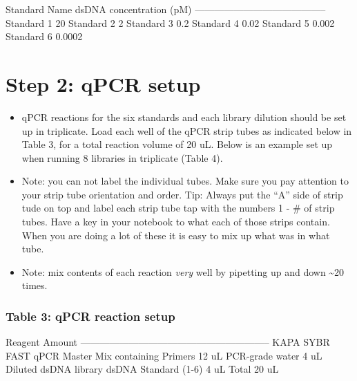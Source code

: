 \documentclass[
  letterpaper,
  DIV=11,
  numbers=noendperiod]{scrreprt}
\begin{document}
\textbar{} Standard Name \textbar{} dsDNA concentration (pM) \textbar{}
\textbar---------------\textbar--------------------------\textbar{}
\textbar{} Standard 1 \textbar{} 20 \textbar{} \textbar{} Standard 2
\textbar{} 2 \textbar{} \textbar{} Standard 3 \textbar{} 0.2 \textbar{}
\textbar{} Standard 4 \textbar{} 0.02 \textbar{} \textbar{} Standard 5
\textbar{} 0.002 \textbar{} \textbar{} Standard 6 \textbar{} 0.0002
\textbar{}

\hypertarget{step-2-qpcr-setup}{%
\section*{\texorpdfstring{\textbf{Step 2: qPCR
setup}}{Step 2: qPCR setup}}\label{step-2-qpcr-setup}}

\begin{itemize}
\item
  qPCR reactions for the six standards and each library dilution should
  be set up in triplicate. Load each well of the qPCR strip tubes as
  indicated below in Table 3, for a total reaction volume of 20 uL.
  Below is an example set up when running 8 libraries in triplicate
  (Table 4).
\item
  Note: you can not label the individual tubes. Make sure you pay
  attention to your strip tube orientation and order. Tip: Always put
  the ``A'' side of strip tude on top and label each strip tube tap with
  the numbers 1 - \# of strip tubes. Have a key in your notebook to what
  each of those strips contain. When you are doing a lot of these it is
  easy to mix up what was in what tube.
\item
  Note: mix contents of each reaction \emph{very} well by pipetting up
  and down \textasciitilde20 times.
\end{itemize}

\hypertarget{table-3-qpcr-reaction-setup}{%
\subsubsection*{\texorpdfstring{\textbf{Table 3: qPCR reaction
setup}}{Table 3: qPCR reaction setup}}\label{table-3-qpcr-reaction-setup}}

\textbar{} Reagent \textbar{} Amount \textbar{}
\textbar---------------------------------------------------\textbar--------\textbar{}
\textbar{} KAPA SYBR FAST qPCR Master Mix containing Primers \textbar{}
12 uL \textbar{} \textbar{} PCR-grade water \textbar{} 4 uL \textbar{}
\textbar{} Diluted dsDNA library dsDNA Standard (1-6) \textbar{} 4 uL
\textbar{} \textbar{} Total \textbar{} 20 uL \textbar{}
\end{document}
